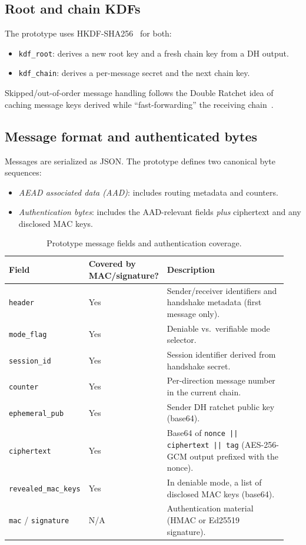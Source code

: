 \documentclass[11pt]{article}
\begin{document}
\subsection{Root and chain KDFs}
The prototype uses HKDF-SHA256~\cite{rfc5869} for both:
\begin{itemize}
\item \texttt{kdf\_root}: derives a new root key and a fresh chain key from a DH output.
\item \texttt{kdf\_chain}: derives a per-message secret and the next chain key.
\end{itemize}
Skipped/out-of-order message handling follows the Double Ratchet idea of caching message keys derived while ``fast-forwarding'' the receiving chain~\cite{signal_doubleratchet}.

\subsection{Message format and authenticated bytes}
Messages are serialized as JSON.
The prototype defines two canonical byte sequences:
\begin{itemize}
\item \emph{AEAD associated data (AAD)}: includes routing metadata and counters.
\item \emph{Authentication bytes}: includes the AAD-relevant fields \emph{plus} ciphertext and any disclosed MAC keys.
\end{itemize}

\begin{table}[t]
\centering
\begin{tabular}{@{}p{0.22\linewidth}p{0.16\linewidth}p{0.56\linewidth}@{}}
\toprule
Field & Covered by MAC/signature? & Description \\
\midrule
\texttt{header} & Yes & Sender/receiver identifiers and handshake metadata (first message only). \\
\texttt{mode\_flag} & Yes & Deniable vs.~verifiable mode selector. \\
\texttt{session\_id} & Yes & Session identifier derived from handshake secret. \\
\texttt{counter} & Yes & Per-direction message number in the current chain. \\
\texttt{ephemeral\_pub} & Yes & Sender DH ratchet public key (base64). \\
\texttt{ciphertext} & Yes & Base64 of \texttt{nonce || ciphertext || tag} (AES-256-GCM output prefixed with the nonce). \\
\texttt{revealed\_mac\_keys} & Yes & In deniable mode, a list of disclosed MAC keys (base64). \\
\texttt{mac} / \texttt{signature} & N/A & Authentication material (HMAC or Ed25519 signature). \\
\bottomrule
\end{tabular}
\caption{Prototype message fields and authentication coverage.}
\label{tab:message-format}
\end{table}
\end{document}
